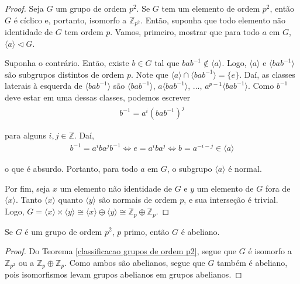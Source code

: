 	\begin{proof}
		Seja $G$ um grupo de ordem $p^2$. Se $G$ tem um elemento de ordem $p^2$, então $G$ é cíclico e, 
		portanto, isomorfo a $\mathbb{Z}_{p^2}$. Então, suponha que todo elemento não identidade de $G$ 
		tem ordem $p$. Vamos, primeiro, mostrar que para todo $a$ em $G$, $\langle a \rangle\vartriangleleft G$.
		
		\par\vspace{0.3cm} Suponha o contrário. Então, existe $b\in G$ tal que $bab^{-1}\notin\langle a \rangle$.
		Logo, $\langle a \rangle$ e $\langle bab^{-1} \rangle$ são subgrupos distintos de ordem $p$. 
		Note que $\langle a \rangle\cap \langle bab^{-1} \rangle = \{e\}$. Daí, as classes laterais à 
		esquerda de $\langle bab^{-1} \rangle$ são $\langle bab^{-1} \rangle$, $a\langle bab^{-1} \rangle$,
		$\dots$, $a^{p-1}\langle bab^{-1} \rangle$. Como $b^{-1}$ deve estar em uma dessas classes, podemos
		escrever
		\begin{align*}
		    b^{-1} = a^i(bab^{-1})^j
		\end{align*}
		\par\vspace{0.3cm} para alguns $i,j\in\mathbb{Z}$. Daí,
		\begin{align*}
		    b^{-1} = a^iba^jb^{-1} \iff e = a^iba^j \iff b = a^{-i-j}\in \langle a \rangle
		\end{align*}
		\par\vspace{0.3cm} o que é absurdo. Portanto, para todo $a$ em $G$, o subgrupo 
		$\langle a \rangle$ é normal.
		
		\par\vspace{0.3cm} Por fim, seja $x$ um elemento não identidade de $G$ e $y$ um elemento de $G$ 
		fora de $\langle x \rangle$. Tanto $\langle x \rangle$ quanto $\langle y \rangle$ são normais 
		de ordem $p$, e sua interseção é trivial. Logo, 
		$G = \langle x \rangle\times\langle y \rangle\cong \langle x \rangle\oplus\langle y \rangle 
		\cong \mathbb{Z}_p\oplus\mathbb{Z}_p$.
	\end{proof}
	\begin{corollary}
	\label{ordem p^2 implica abeliano}
		Se $G$ é um grupo de ordem $p^2$, $p$ primo, então $G$ é abeliano.
	\end{corollary}
	\begin{proof}
		Do Teorema \ref{classificacao grupos de ordem p2}, segue que $G$ é isomorfo a 
		$\mathbb{Z}_{p^2}$ ou a $\mathbb{Z}_p\oplus\mathbb{Z}_p$. Como ambos são abelianos, segue que 
		$G$ também é abeliano, pois isomorfismos levam grupos abelianos em grupos abelianos.
	\end{proof}
